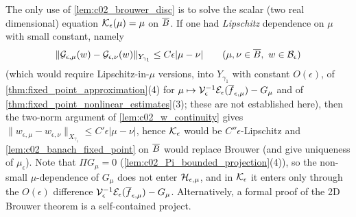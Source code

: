 \begin{remark}
  \label{rmk:c02_avoid_brouwer}
  The only use of \cref{lem:c02_brouwer_disc} is to solve the scalar (two real dimensional) equation
  $\mathcal{K}_\epsilon(\mu)=\mu$ on $\overline{B}$. If one had \emph{Lipschitz} dependence on $\mu$ with small constant, namely
  \[
    \|\mathcal{G}_{\epsilon,\mu}(w)-\mathcal{G}_{\epsilon,\nu}(w)\|_{Y_{\gamma_1}}\le C\epsilon|\mu-\nu|\qquad(\mu,\nu\in\overline{B},\ w\in\mathcal{B}_\epsilon)
  \]
  (which would require Lipschitz-in-$\mu$ versions, into $Y_{\gamma_1}$ with constant $O(\epsilon)$, of
  \cref{thm:fixed_point_approximation}(4) for $\mu\mapsto\mathcal{V}_\epsilon^{-1}\mathcal{E}_\epsilon(\overline{f}_{\epsilon,\mu})-G_\mu$ and of
  \cref{thm:fixed_point_nonlinear_estimates}(3); these are not established here), then the two-norm argument of
  \cref{lem:c02_w_continuity} gives $\|w_{\epsilon,\mu}-w_{\epsilon,\nu}\|_{X_{\gamma_1}}\le C'\epsilon|\mu-\nu|$, hence $\mathcal{K}_\epsilon$ would be
  $C''\epsilon$-Lipschitz and \cref{lem:c02_banach_fixed_point} on $\overline{B}$ would replace Brouwer (and give uniqueness
  of $\mu_\epsilon$). Note that $\Pi G_\mu=0$ (\cref{lem:c02_Pi_bounded_projection}(4)), so the non-small $\mu$-dependence of
  $G_\mu$ does not enter $\mathcal{H}_{\epsilon,\mu}$, and in $\mathcal{K}_\epsilon$ it enters only through the $O(\epsilon)$ difference
  $\mathcal{V}_\epsilon^{-1}\mathcal{E}_\epsilon(\overline{f}_{\epsilon,\mu})-G_\mu$. Alternatively, a formal proof of the 2D Brouwer theorem is a
  self-contained project.
\end{remark}
